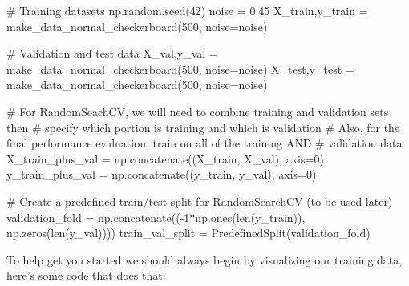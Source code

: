 \documentclass[
  letterpaper,
  DIV=11,
  numbers=noendperiod]{scrartcl}
\newenvironment{Shaded}{\begin{snugshade}}{\end{snugshade}}
\newcommand{\BuiltInTok}[1]{\textcolor[rgb]{0.00,0.23,0.31}{#1}}
\newcommand{\CommentTok}[1]{\textcolor[rgb]{0.37,0.37,0.37}{#1}}
\newcommand{\DecValTok}[1]{\textcolor[rgb]{0.68,0.00,0.00}{#1}}
\newcommand{\FloatTok}[1]{\textcolor[rgb]{0.68,0.00,0.00}{#1}}
\newcommand{\NormalTok}[1]{\textcolor[rgb]{0.00,0.23,0.31}{#1}}
\newcommand{\OperatorTok}[1]{\textcolor[rgb]{0.37,0.37,0.37}{#1}}
\begin{document}
\begin{Shaded}
\begin{Highlighting}[]
\CommentTok{\# Training datasets}
\NormalTok{np.random.seed(}\DecValTok{42}\NormalTok{)}
\NormalTok{noise }\OperatorTok{=} \FloatTok{0.45}
\NormalTok{X\_train,y\_train }\OperatorTok{=}\NormalTok{ make\_data\_normal\_checkerboard(}\DecValTok{500}\NormalTok{, noise}\OperatorTok{=}\NormalTok{noise)}
    
\CommentTok{\# Validation and test data}
\NormalTok{X\_val,y\_val }\OperatorTok{=}\NormalTok{ make\_data\_normal\_checkerboard(}\DecValTok{500}\NormalTok{, noise}\OperatorTok{=}\NormalTok{noise)}
\NormalTok{X\_test,y\_test }\OperatorTok{=}\NormalTok{ make\_data\_normal\_checkerboard(}\DecValTok{500}\NormalTok{, noise}\OperatorTok{=}\NormalTok{noise)}

\CommentTok{\# For RandomSeachCV, we will need to combine training and validation sets then}
\CommentTok{\#  specify which portion is training and which is validation}
\CommentTok{\# Also, for the final performance evaluation, train on all of the training AND }
\CommentTok{\#  validation data}
\NormalTok{X\_train\_plus\_val }\OperatorTok{=}\NormalTok{ np.concatenate((X\_train, X\_val), axis}\OperatorTok{=}\DecValTok{0}\NormalTok{)}
\NormalTok{y\_train\_plus\_val }\OperatorTok{=}\NormalTok{ np.concatenate((y\_train, y\_val), axis}\OperatorTok{=}\DecValTok{0}\NormalTok{)}

\CommentTok{\# Create a predefined train/test split for RandomSearchCV (to be used later)}
\NormalTok{validation\_fold }\OperatorTok{=}\NormalTok{ np.concatenate((}\OperatorTok{{-}}\DecValTok{1}\OperatorTok{*}\NormalTok{np.ones(}\BuiltInTok{len}\NormalTok{(y\_train)), np.zeros(}\BuiltInTok{len}\NormalTok{(y\_val))))}
\NormalTok{train\_val\_split }\OperatorTok{=}\NormalTok{ PredefinedSplit(validation\_fold)}
\end{Highlighting}
\end{Shaded}

To help get you started we should always begin by visualizing our
training data, here's some code that does that:
\end{document}
